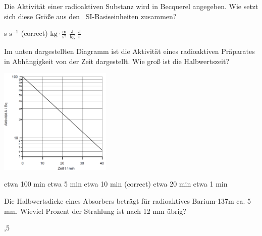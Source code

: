 \documentclass[11pt]{exam}
\begin{document}
\setlength{\voffset}{-0.5in}
\setlength{\headsep}{5pt}

\hspace{2mm}
 \hspace{5mm}
\vspace{4mm}

\begin{questions}

\question Die Aktivität einer radioaktiven Substanz wird in Becquerel angegeben. Wie setzt sich diese Größe aus den  SI-Basiseinheiten zusammen?

\begin{choices}
	\choice s
	\choice \( \text{s}^{-1} \) (correct)
	\choice \( \text{kg}\cdot\frac{\text{m}}{\text{s}^2} \)
	\choice \( \frac{\text{J}}{\text{kg}} \)
	\choice \( \frac{\text{J}}{\text{s}} \)
\end{choices}

\vspace{3mm}\question Im unten dargestellten Diagramm ist die Aktivität eines radioaktiven Präparates in Abhängigkeit von der Zeit dargestellt. Wie groß ist die Halbwertszeit? 

\includegraphics[width=0.4\textwidth]{images/zerfallsgesetz.png}

\begin{choices}
	\choice etwa 100 min
	\choice etwa 5 min
	\choice etwa 10 min (correct)
	\choice etwa 20 min
	\choice etwa 1 min
\end{choices}

\vspace{3mm}\question Die Halbwertsdicke eines Absorbers beträgt für radioaktives Barium-137m ca. 5 mm. Wieviel Prozent der Strahlung ist nach 12 mm übrig?

\begin{choices}
	,5 %
\end{choices}


\end{questions}
\end{document}
